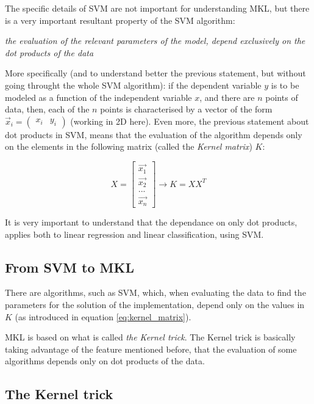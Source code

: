 \documentclass[paper=a4, fontsize=11pt]{scrartcl} %
\numberwithin{equation}{section} %
\numberwithin{figure}{section} %
\numberwithin{table}{section} %
\begin{document}
The specific details of SVM are not important for understanding MKL, but there is a very important resultant property of the SVM algorithm:

\begin{center}
\textit{the evaluation of the relevant parameters of the model, depend exclusively on the dot products of the data}
\end{center}

More specifically (and to understand better the previous statement, but without going throught the whole SVM algorithm): if the dependent variable $y$ is to be modeled as a function of the independent variable $x$, and there are $n$ points of data, then, each of the $n$ points is characterised by a vector of the form $\vec{x}_{i} = \begin{pmatrix} x_{i} & y_{i}\end{pmatrix}$ (working in 2D here). Even more, the previous statement about dot products in SVM, means that the evaluation of the algorithm depends only on the elements in the following matrix (called the \textit{Kernel matrix}) $K$:

\begin{equation}
 X=\begin{bmatrix}
  \vec{x_{1}} \\
  \vec{x_{2}} \\
  ...\\
  \vec{x_{n}}
 \end{bmatrix} \rightarrow 
  K = XX^{T}
\label{eq:kernel_matrix}
\end{equation}

It is very important to understand that the dependance on only dot products, applies both to linear regression and linear classification, using SVM.


\subsection{From SVM to MKL}

There are algorithms, such as SVM, which, when evaluating the data to find the parameters for the solution of the implementation, depend only on the values in $K$ (as introduced in equation \ref{eq:kernel_matrix}).

MKL is based on what is called \textit{the Kernel trick}. The Kernel trick is basically taking advantage of the feature mentioned before, that the evaluation of some algorithms depends only on dot products of the data.

\subsection{The Kernel trick}
\end{document}
